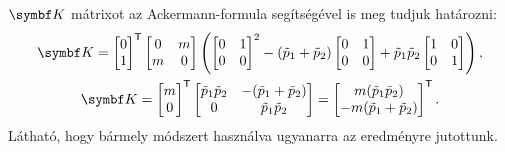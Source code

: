 $\rmat K$ mátrixot az Ackermann-formula segítségével is meg tudjuk határozni:
\begin{gather}
  \rmat K = \begin{bmatrix}
    0 \\ 1
  \end{bmatrix}^\T \begin{bmatrix}
    0 & m \\ m & 0
  \end{bmatrix} \left(
  \begin{bmatrix}
    0 & 1 \\ 0 & 0
  \end{bmatrix}^2 - (\tilde p_1 + \tilde p_2) \begin{bmatrix}
    0 & 1 \\ 0 & 0
  \end{bmatrix} + \tilde p_1 \tilde p_2 \begin{bmatrix}
    1 & 0 \\ 0 & 1
  \end{bmatrix}
  \right),
  \\
  \rmat K = \begin{bmatrix}
    m \\ 0
  \end{bmatrix}^\T \begin{bmatrix}
    \tilde p_1 \tilde p_2 & -(\tilde p_1 + \tilde p_2) \\
    0                     & \tilde p_1 \tilde p_2
  \end{bmatrix} = \begin{bmatrix}
    m (\tilde p_1 \tilde p_2) \\
    -m (\tilde p_1 + \tilde p_2)
  \end{bmatrix}^\T.
\end{gather}
Látható, hogy bármely módszert használva ugyanarra az eredményre jutottunk.

